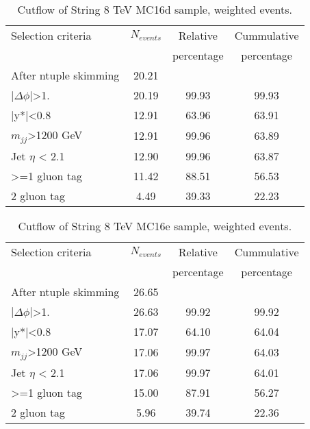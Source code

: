 \begin{table}[ht]
\begin{center}
\begin{tabular}{|l|c|c|c|}
\hline
Selection criteria & $N_{events}$ & Relative & Cummulative \\
 & & percentage & percentage \\
\hline
After ntuple skimming & 20.21 &  &  \\
$|\Delta\phi|$>1. & 20.19 & 99.93 & 99.93 \\
|y*|<0.8 & 12.91 & 63.96 & 63.91 \\
$m_{jj}$>1200 GeV & 12.91 & 99.96 & 63.89 \\
Jet $\eta$ < 2.1 & 12.90 & 99.96 & 63.87 \\
>=1 gluon tag & 11.42 & 88.51 & 56.53 \\
2 gluon tag & 4.49 & 39.33 & 22.23 \\
\hline
\end{tabular}
\end{center}
\caption{Cutflow of String 8 TeV MC16d sample, weighted events.}
\label{tab:String8MC16d}
\end{table}

\begin{table}[ht]
\begin{center}
\begin{tabular}{|l|c|c|c|}
\hline
Selection criteria & $N_{events}$ & Relative & Cummulative \\
 & & percentage & percentage \\
\hline
After ntuple skimming & 26.65 &  &  \\
$|\Delta\phi|$>1. & 26.63 & 99.92 & 99.92 \\
|y*|<0.8 & 17.07 & 64.10 & 64.04 \\
$m_{jj}$>1200 GeV & 17.06 & 99.97 & 64.03 \\
Jet $\eta$ < 2.1 & 17.06 & 99.97 & 64.01 \\
>=1 gluon tag & 15.00 & 87.91 & 56.27 \\
2 gluon tag & 5.96 & 39.74 & 22.36 \\
\hline
\end{tabular}
\end{center}
\caption{Cutflow of String 8 TeV MC16e sample, weighted events.}
\label{tab:String8MC16e}
\end{table}

